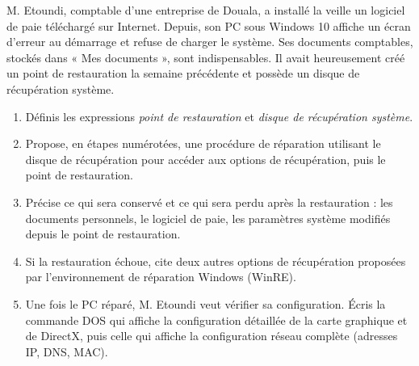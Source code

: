 \documentclass[11pt]{article}
\begin{document}
\begin{exercice}
M. Etoundi, comptable d'une entreprise de Douala, a installé la veille un logiciel de paie téléchargé sur Internet. Depuis, son PC sous Windows 10 affiche un écran d'erreur au démarrage et refuse de charger le système. Ses documents comptables, stockés dans « Mes documents », sont indispensables. Il avait heureusement créé un point de restauration la semaine précédente et possède un disque de récupération système.
\begin{enumerate}
  \item Définis les expressions \emph{point de restauration} et \emph{disque de récupération système}.
  \item Propose, en étapes numérotées, une procédure de réparation utilisant le disque de récupération pour accéder aux options de récupération, puis le point de restauration.
  \item Précise ce qui sera conservé et ce qui sera perdu après la restauration : les documents personnels, le logiciel de paie, les paramètres système modifiés depuis le point de restauration.
  \item Si la restauration échoue, cite deux autres options de récupération proposées par l'environnement de réparation Windows (WinRE).
  \item Une fois le PC réparé, M. Etoundi veut vérifier sa configuration. Écris la commande DOS qui affiche la configuration détaillée de la carte graphique et de DirectX, puis celle qui affiche la configuration réseau complète (adresses IP, DNS, MAC).
\end{enumerate}
\end{exercice}
\end{document}
